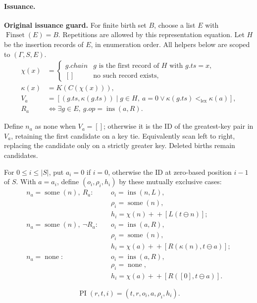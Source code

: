 \paragraph{Issuance.}
\textbf{Original issuance guard.} For finite birth set $B$, choose a list $E$ with $\operatorname{Finset}(E)=B$. Repetitions are allowed by this representation equation. Let $H$ be the insertion records of $E$, in enumeration order. All helpers below are scoped to $(\Gamma,S,E)$.
\[
\begin{aligned}\chi(x)&=\begin{cases}g.chain&g\text{ is the first record of }H\text{ with }g.ts=x,\\{}[]&\text{no such record exists},\end{cases}\\\kappa(x)&=K(C(\chi(x))),\\V_a&=[(g.ts,\kappa(g.ts))\mid g\in H,\ a=0\lor\kappa(g.ts)<_{\mathrm{lex}}\kappa(a)],\\R_a&\iff\exists g\in E,\ g.op=\operatorname{ins}(a,R).\end{aligned}
\]

Define $n_a$ as none when $V_a=[]$; otherwise it is the ID of the greatest-key pair in $V_a$, retaining the first candidate on a key tie. Equivalently scan left to right, replacing the candidate only on a strictly greater key. Deleted births remain candidates.

For $0\le i\le|S|$, put $a_i=0$ if $i=0$, otherwise the ID at zero-based position $i-1$ of $S$. With $a=a_i$, define $(o_i,\rho_i,h_i)$ by these mutually exclusive cases:
\[
\begin{aligned}n_a=\operatorname{some}(n),\ R_a:\quad&o_i=\operatorname{ins}(n,L),\\&\rho_i=\operatorname{some}(n),\\&h_i=\chi(n)+\!+[L(t\mathbin{\ominus} n)];\\n_a=\operatorname{some}(n),\ \neg R_a:\quad&o_i=\operatorname{ins}(a,R),\\&\rho_i=\operatorname{some}(n),\\&h_i=\chi(a)+\!+[R(\kappa(n),t\mathbin{\ominus} a)];\\n_a=\operatorname{none}:\quad&o_i=\operatorname{ins}(a,R),\\&\rho_i=\operatorname{none},\\&h_i=\chi(a)+\!+[R([0],t\mathbin{\ominus} a)].\end{aligned}
\]

\[
\operatorname{PI}(r,t,i)=(t,r,o_i,a,\rho_i,h_i).
\]


